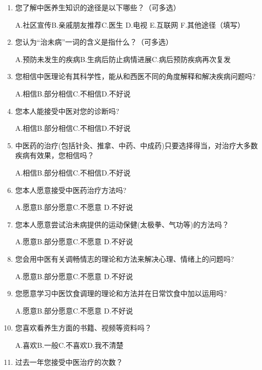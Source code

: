 \documentclass{article}
\begin{document}
\begin{spacing}{0.9}
\begin{enumerate}
A.正确\qquad B.部分正确\qquad C.错误 \qquad D.不清楚

\item 您了解中医养生知识的途径是以下哪些？（可多选）

A.社区宣传\qquad B.亲戚朋友推荐\qquad C.医生\qquad
D.电视\qquad
E.互联网\qquad
F.其他途径（填写）\underline{\makebox[6em]{}}

\item 您认为“治未病”一词的含义是指什么？（可多选）

A.预防未发生的疾病\qquad B.生病后防止病情进展\qquad C.病后预防疾病再次复发

\item 
您相信中医理论有其科学性，能从和西医不同的角度解释和解决疾病问题吗?

A.相信\qquad B.部分相信\qquad C.不相信\qquad D.不好说

\item 您本人能接受中医对您的诊断吗?

A.相信\qquad B.部分相信\qquad C.不相信\qquad D.不好说

\item 中医药的治疗(包括针灸、推拿、中药、中成药)只要选择得当，对治疗大多数疾病有效果，您相信吗？

A.相信\qquad B.部分相信\qquad C.不相信\qquad D.不好说

\item 您本人愿意接受中医药治疗方法吗?

A.愿意\qquad B.部分愿意\qquad C.不愿意 \qquad D.不好说

\item 您本人愿意尝试治未病提供的运动保健(太极拳、气功等)的方法吗？

A.愿意\qquad B.部分愿意\qquad C.不愿意 \qquad D.不好说

\item 您会用中医有关调畅情志的理论和方法来解决心理、情绪上的问题吗?

A.愿意\qquad B.部分愿意\qquad C.不愿意 \qquad D.不好说

\item 您愿意学习中医饮食调理的理论和方法并在日常饮食中加以运用吗?

A.愿意\qquad B.部分愿意\qquad C.不愿意 \qquad D.不好说

\item 您喜欢看养生方面的书籍、视频等资料吗？

A.喜欢\qquad B.一般\qquad C.不喜欢\qquad D.我不清楚


\item
过去一年您接受中医治疗的次数？


\end{enumerate}
\end{spacing}
\end{document}
